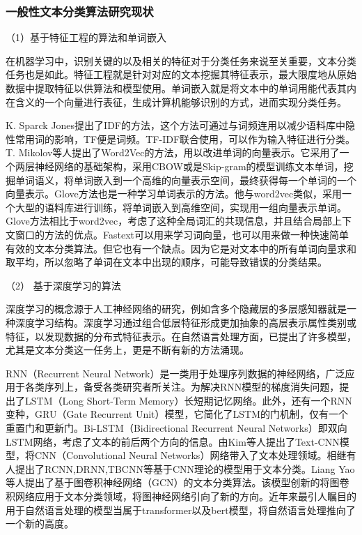 \subsubsection{一般性文本分类算法研究现状}
（1）基于特征工程的算法和单词嵌入

在机器学习中，识别关键的以及相关的特征对于分类任务来说至关重要，文本分类任务也是如此。特征工程就是针对对应的文本挖掘其特征表示，最大限度地从原始数据中提取特征以供算法和模型使用。单词嵌入就是将文本中的单词用能代表其内在含义的一个向量进行表征，生成计算机能够识别的方式，进而实现分类任务。

K. Sparck Jones提出了IDF的方法，这个方法可通过与词频连用以减少语料库中隐性常用词的影响，TF便是词频。TF-IDF联合使用，可以作为输入特征进行分类。T. Mikolov等人提出了Word2Vec的方法，用以改进单词的向量表示。它采用了一个两层神经网络的基础架构，采用CBOW或是Skip-gram的模型训练文本单词，挖掘单词语义，将单词嵌入到一个高维的向量表示空间，最终获得每一个单词的一个向量表示。Glove方法也是一种学习单词表示的方法。他与word2vec类似，采用一个大型的语料库进行训练，将单词嵌入到高维空间，实现用一组向量表示单词。Glove方法相比于word2vec，考虑了这种全局词汇的共现信息，并且结合局部上下文窗口的方法的优点。Fastext可以用来学习词向量，也可以用来做一种快速简单有效的文本分类算法。但它也有一个缺点。因为它是对文本中的所有单词向量求和取平均，所以忽略了单词在文本中出现的顺序，可能导致错误的分类结果。

（2） 基于深度学习的算法

深度学习的概念源于人工神经网络的研究，例如含多个隐藏层的多层感知器就是一种深度学习结构。深度学习通过组合低层特征形成更加抽象的高层表示属性类别或特征，以发现数据的分布式特征表示。在自然语言处理方面，已提出了许多模型，尤其是文本分类这一任务上，更是不断有新的方法涌现。

RNN（Recurrent Neural Network）是一类用于处理序列数据的神经网络，广泛应用于各类序列上，备受各类研究者所关注。为解决RNN模型的梯度消失问题，提出了LSTM（Long Short-Term Memory）长短期记忆网络。此外，还有一个RNN变种，GRU（Gate Recurrent Unit）模型，它简化了LSTM的门机制，仅有一个重置门和更新门。Bi-LSTM（Bidirectional Recurrent Neural Networks）即双向LSTM网络，考虑了文本的前后两个方向的信息。由Kim等人提出了Text-CNN模型，将CNN（Convolutional Neural Networks）网络带入了文本处理领域。相继有人提出了RCNN,DRNN,TBCNN等基于CNN理论的模型用于文本分类。Liang Yao等人提出了基于图卷积神经网络（GCN）的文本分类算法。该模型创新的将图卷积网络应用于文本分类领域，将图神经网络引向了新的方向。近年来最引人瞩目的用于自然语言处理的模型当属于transformer以及bert模型，将自然语言处理推向了一个新的高度。

